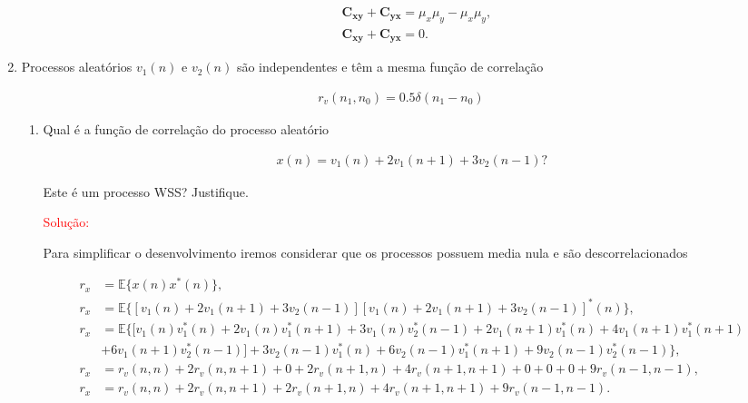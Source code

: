 \documentclass[a4paper,10pt]{article}
\begin{document}
\begin{enumerate}
\begin{enumerate}
						\begin{align}
							&\mathbf{C_{xy}} + \mathbf{C_{yx}}  = \mu_{x} \mu_{y} - \mu_{x} \mu_{y}, \\
							&\mathbf{C_{xy}} + \mathbf{C_{yx}}  = 0.
						\end{align}
					
					
				\end{enumerate}
			
			\item Processos aleatórios $v_1(n)$ e $v_2(n)$  são independentes e têm a mesma função de correlação
			
				\begin{align}
					r_v(n_1,n_0) = 0.5\delta(n_1 - n_0)
				\end{align}
			 
			 	\begin{enumerate}
			 		
			 		\item Qual é a função de correlação do processo aleatório
			 		
				 		\begin{align}
				 			x(n) = v_1(n) + 2v_1(n + 1) + 3v_2(n-1) ?
				 		\end{align}
				 		
				 		Este é um processo WSS? Justifique.
				 		
				 		\textcolor{red}{Solução:}
				 		
				 		Para simplificar o desenvolvimento iremos considerar que os processos possuem media nula e são descorrelacionados
				 		
				 		\begin{align*}
				 			r_{x} &= \mathbb{E}\{x(n) x^{*}(n)\}, \\
				 			r_{x} &= \mathbb{E}\{[v_{1}(n) + 2v_{1}(n+1) + 3v_{2}(n-1)] [v_{1}(n) + 2v_{1}(n+1) + 3v_{2}(n-1)]^{*}(n)\}, \\
				 			r_{x} &= \mathbb{E}\{[v_{1}(n)v^{*}_{1}(n) + 2v_{1}(n)v^{*}_{1}(n+1) + 3v_{1}(n)v^{*}_{2}(n-1) + 2v_{1}(n + 1)v^{*}_{1}(n) + 4v_{1}(n+1)v^{*}_{1}(n+1) \\
							&+6v_{1}(n+1)v^{*}_{2}(n-1)] + 3v_{2}(n-1)v^{*}_{1}(n) +  6v_{2}(n-1)v^{*}_{1}(n+1) + 9v_{2}(n-1)v^{*}_{2}(n-1)\}, \\
				 			r_{x} &= r_{v}(n,n) + 2r_{v}(n,n+1) + 0 + 2r_{v}(n+1,n) + 4r_{v}(n+1,n+1) + 0 + 0 + 0 + 9r_{v}(n-1,n-1), \\
				 			r_{x} &= r_{v}(n,n) + 2r_{v}(n,n+1) + 2r_{v}(n+1,n) + 4r_{v}(n+1,n+1) + 9r_{v}(n-1,n-1).
				 		\end{align*}
				 		

\end{enumerate}
\end{enumerate}
\end{document}

